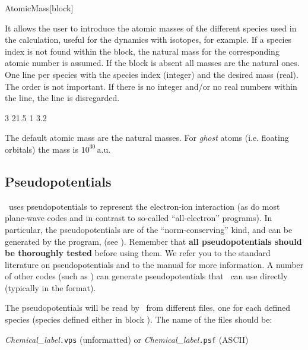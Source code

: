 \begin{fdfentry}{AtomicMass}[block]

  It allows the user to introduce the atomic masses of the different
  species used in the calculation, useful for the dynamics with
  isotopes, for example. If a species index is not
  found within the block, the natural mass for the corresponding
  atomic number is assumed. If the block is absent all masses are the
  natural ones. One line per species with the species index (integer)
  and the desired mass (real). The order is not important. If there is
  no integer and/or no real numbers within the line, the line is
  disregarded.

  \begin{fdfexample}
        3  21.5
        1  3.2
  \end{fdfexample}

  The default atomic mass are the natural masses. For \emph{ghost}
  atoms (i.e. floating orbitals) the mass is $10^{30}\,\mathrm{a.u.}$ 

\end{fdfentry}



\subsection{Pseudopotentials}

\siesta\ uses pseudopotentials to represent the electron-ion
interaction (as do most plane-wave codes and in contrast to so-called
``all-electron'' programs). In particular, the pseudopotentials are of
the ``norm-conserving'' kind, and can be generated by the  program,
(see ). Remember that \textbf{all pseudopotentials
  should be thoroughly tested} before using them. We refer you to the
standard literature on pseudopotentials and to the  manual
for more information. A number of
other codes (such as ) can generate pseudopotentials that
\siesta\ can use directly (typically in the  format).

The pseudopotentials will be read by \siesta\ from different files, one
for each defined species (species defined either in block
).
The name of the files should be:

\textit{Chemical\_label}\texttt{.vps} (unformatted) or
\textit{Chemical\_label}\texttt{.psf} (ASCII)

